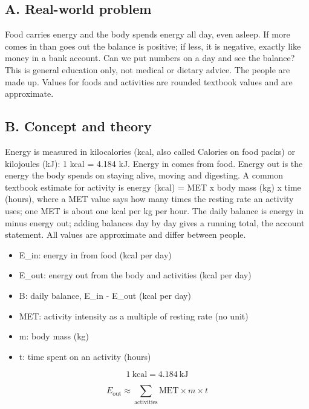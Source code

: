 \documentclass[11pt,a4paper]{article}
\begin{document}
\subsection*{A. Real-world problem}
Food carries energy and the body spends energy all day, even asleep. If more comes in than goes out the balance is positive; if less, it is negative, exactly like money in a bank account. Can we put numbers on a day and see the balance? This is general education only, not medical or dietary advice. The people are made up. Values for foods and activities are rounded textbook values and are approximate.

\subsection*{B. Concept and theory}
Energy is measured in kilocalories (kcal, also called Calories on food packs) or kilojoules (kJ): 1 kcal = 4.184 kJ. Energy in comes from food. Energy out is the energy the body spends on staying alive, moving and digesting. A common textbook estimate for activity is energy (kcal) = MET x body mass (kg) x time (hours), where a MET value says how many times the resting rate an activity uses; one MET is about one kcal per kg per hour. The daily balance is energy in minus energy out; adding balances day by day gives a running total, the account statement. All values are approximate and differ between people.

\begin{itemize}[nosep]
\item E\_in: energy in from food (kcal per day)
\item E\_out: energy out from the body and activities (kcal per day)
\item B: daily balance, E\_in - E\_out (kcal per day)
\item MET: activity intensity as a multiple of resting rate (no unit)
\item m: body mass (kg)
\item t: time spent on an activity (hours)
\end{itemize}

\begin{equation*}
1\ \mathrm{kcal}=4.184\ \mathrm{kJ}
\end{equation*}

\begin{equation*}
E_{\mathrm{out}}\approx\sum_{\text{activities}}\mathrm{MET}\times m\times t
\end{equation*}
\end{document}
